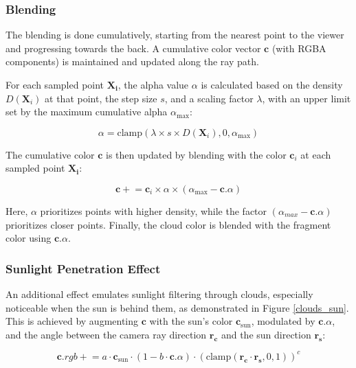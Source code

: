 \subsubsection{Blending}
\label{Cloud Blending}

The blending is done cumulatively, starting from the nearest point to the viewer and progressing towards the back. A cumulative color vector $\mathbf{c}$ (with RGBA components) is maintained and updated along the ray path.

For each sampled point $\mathbf{X_i}$, the alpha value $\alpha$ is calculated based on the density $D(\mathbf{X}_i)$ at that point, the step size $s$, and a scaling factor $\lambda$, with an upper limit set by the maximum cumulative alpha $\alpha_{\text{max}}$:

\begin{equation}
  \alpha = \text{clamp}(\lambda \times s \times D(\mathbf{X}_i), 0, \alpha_{\text{max}})
\end{equation}

The cumulative color $\mathbf{c}$ is then updated by blending with the color $\mathbf{c}_i$ at each sampled point $\mathbf{X_i}$:
  
\begin{equation}
  \mathbf{c} \mathrel{+}= \mathbf{c}_i \times \alpha \times (\alpha_{\text{max}} - \mathbf{c}.\alpha)
\end{equation}

Here, $\alpha$ prioritizes points with higher density, while the factor $(\alpha_{max} - \mathbf{c}.\alpha)$ prioritizes closer points. Finally, the cloud color is blended with the fragment color using $\mathbf{c}.\alpha$.


\subsubsection{Sunlight Penetration Effect}

An additional effect emulates sunlight filtering through clouds, especially noticeable when the sun is behind them, as demonstrated in Figure \ref{clouds_sun}. This is achieved by augmenting $\mathbf{c}$ with the sun's color $\mathbf{c}_{\text{sun}}$, modulated by $\mathbf{c}.\alpha$, and the angle between the camera ray direction $\mathbf{r_c}$ and the sun direction $\mathbf{r_s}$:

\begin{equation}
  \mathbf{c}.rgb \mathrel{+}= a \cdot \mathbf{c}_{\text{sun}} \cdot (1 - b \cdot \mathbf{c}.\alpha) \cdot (\text{clamp}(\mathbf{r_c} \cdot \mathbf{r_s}, 0, 1))^ c
\end{equation}

